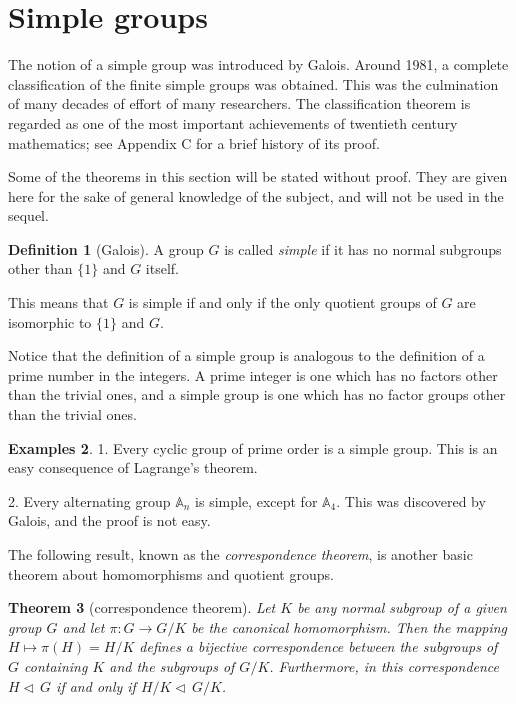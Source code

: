 \documentclass[11pt,oneside]{article}
\newtheorem{thm}{Theorem}[section]
\theoremstyle{definition}
\newtheorem{defn}[thm]{Definition}
\newtheorem{examples}[thm]{Examples}
\newcommand{\Alt}{\mathbb{A}}
\newcommand{\normal}{\triangleleft\,}%
\begin{document}
\setcounter{section}{22}


\section{Simple groups}\noindent
The notion of a simple group was introduced by Galois. Around 1981, a
complete classification of the finite simple groups was obtained. This
was the culmination of many decades of effort of many researchers. The
classification theorem is regarded as one of the most important
achievements of twentieth century mathematics; see Appendix C for a
brief history of its proof.

Some of the theorems in this section will be stated without
proof. They are given here for the sake of general knowledge of the
subject, and will not be used in the sequel.


\begin{defn}[Galois]
A group $G$ is called {\em simple} if it has no normal subgroups other
than $\{1\}$ and $G$ itself.
\end{defn}

This means that $G$ is simple if and only if the only quotient groups
of $G$ are isomorphic to $\{1\}$ and $G$.

Notice that the definition of a simple group is analogous to the
definition of a prime number in the integers. A prime integer is one
which has no factors other than the trivial ones, and a simple group
is one which has no factor groups other than the trivial ones.


\begin{examples}  
  1. Every cyclic group of prime order is a
simple group. This is an easy consequence of Lagrange's theorem.

  2. Every alternating group
  $\Alt_n$ is simple, except for $\Alt_4$. This was discovered by
  Galois, and the proof is not easy.
\end{examples}

The following result, known as the \emph{correspondence theorem}, is
another basic theorem about homomorphisms and quotient groups.


\begin{thm}[correspondence theorem] 
\label{CT}%
Let $K$ be any normal subgroup of a given group $G$ and let $\pi: G
\to G/K$ be the canonical homomorphism.  Then the mapping $H \mapsto
\pi(H)=H/K$ defines a bijective correspondence between the subgroups
of $G$ containing $K$ and the subgroups of $G/K$.  Furthermore, in
this correspondence $H \normal G$ if and only if $H/K \normal G/K$.
\end{thm}
\end{document}
